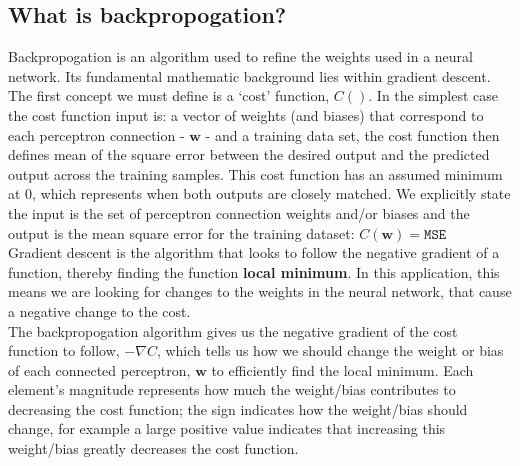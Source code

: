 \documentclass[12pt]{article}
\numberwithin{equation}{section}
\def\vw{{\bm{w}}}
\begin{document}
	\subsection{What is backpropogation?} \label{sec: 4-6-backpropogation}
		Backpropogation is an algorithm used to refine the weights used in a neural network. Its fundamental mathematic background lies within gradient descent.\\
		The first concept we must define is a `cost' function, ${C}()$. In the simplest case the cost function input is: a vector of weights (and biases) that correspond to each perceptron connection - $\vw$ - and a training data set, the cost function then defines mean of the square error between the desired output and the predicted output across the training samples. This cost function has an assumed minimum at $0$, which represents when both outputs are closely matched. We explicitly state the input is the set of perceptron connection weights and/or biases and the output is the mean square error for the training dataset: ${C}(\vw)=\texttt{MSE}$\\
		Gradient descent is the algorithm that looks to follow the negative gradient of a function, thereby finding the function \textbf{local minimum}. In this application, this means we are looking for changes to the weights in the neural network, that cause a negative change to the cost. \\
		The backpropogation algorithm gives us the negative gradient of the cost function to follow, $-\nabla{C}$, which tells us how we should change the weight or bias of each connected perceptron, $\vw$ to efficiently find the local minimum. Each element's magnitude represents how much the weight/bias contributes to decreasing the cost function; the sign indicates how the weight/bias should change, for example a large positive value indicates that increasing this weight/bias greatly decreases the cost function.
		
\end{document}
